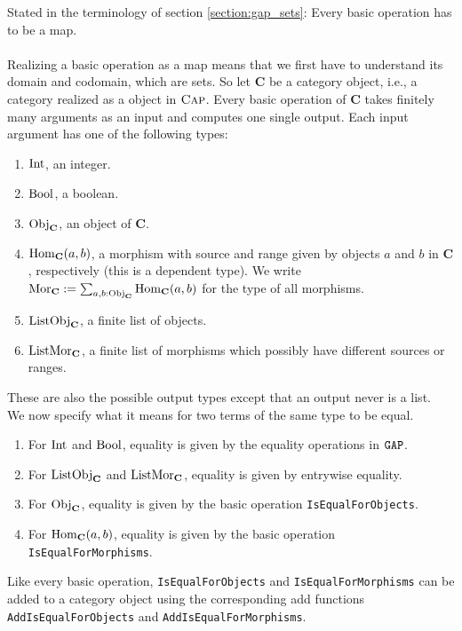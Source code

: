 Stated in the terminology of section \ref{section:gap_sets}: Every basic operation has to be a \GAP map.
\\ \\
Realizing a basic operation as a \GAP map means that we first have to understand its domain and codomain,
which are \GAP sets.
So let $\mathbf{C}$ be a category object, i.e., a category realized as a \GAP object in $\textsc{Cap}$.
Every basic operation of $\mathbf{C}$ takes finitely many arguments as an input and computes one single output.
Each input argument has one of the following types:
\begin{enumerate}
 \item $\mathrm{Int}$, an integer.
 \item $\mathrm{Bool}$, a boolean.
 \item $\mathrm{Obj}_{\mathbf{C}}$, an object of $\mathbf{C}$.
 \item $\operatorname{\mathrm{Hom}}_{\mathbf{C}}( a, b )$, a morphism with source and range given by objects $a$ and $b$ in $\mathbf{C}$, respectively (this is a dependent type).
       We write $\mathrm{Mor}_{\mathbf{C}} := \sum_{a,b: \mathrm{Obj}_{\mathbf{C}}} \operatorname{\mathrm{Hom}}_{\mathbf{C}}( a, b )$ for the type of all morphisms.
 \item $\mathrm{ListObj}_{\mathbf{C}}$, a finite list of objects.
 \item $\mathrm{ListMor}_{\mathbf{C}}$, a finite list of morphisms which possibly have different sources or ranges.
\end{enumerate}
These are also the possible output types except that an output never is a list. \\
We now specify what it means for two terms of the same type to be equal.
\begin{enumerate}
 \item For $\mathrm{Int}$ and $\mathrm{Bool}$, equality is given by the equality operations in $\texttt{GAP}$.
 \item For $\mathrm{ListObj}_{\mathbf{C}}$ and $\mathrm{ListMor}_{\mathbf{C}}$, equality is given by entrywise equality.
 \item For $\mathrm{Obj}_{\mathbf{C}}$, equality is given by the basic operation \texttt{IsEqualForObjects}.
 \item For $\operatorname{\mathrm{Hom}}_{\mathbf{C}}( a, b )$, equality is given by the basic operation \texttt{IsEqualForMorphisms}.
\end{enumerate}

Like every basic operation, \texttt{IsEqualForObjects} and \texttt{IsEqualForMorphisms} can be added to 
a category object using the corresponding add functions \texttt{AddIsEqualForObjects} and \texttt{AddIsEqualForMorphisms}.

